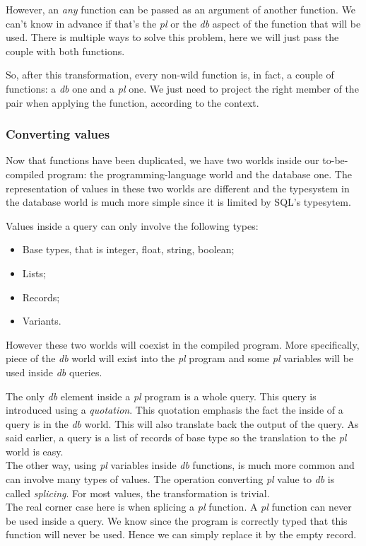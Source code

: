 \documentclass[11pt]{article}
\newcommand\mysc[1]{{\rmfamily\textsc{#1}}\xspace}
\newcommand\sql{\mysc{SQL}}
\newcommand\effect[1]{{\em #1}}
\begin{document}
However, an \effect{any} function can be passed as an argument of another function. We can't know in advance if that's the \effect{pl} or the \effect{db} aspect of the function that will be used. There is multiple ways to solve this problem, here we will just pass the couple with both functions.

So, after this transformation, every non-wild function is, in fact, a couple of functions: a \effect{db} one and a \effect{pl} one. We just need to project the right member of the pair when applying the function, according to the context.

\subsubsection{Converting values}

Now that functions have been duplicated, we have two worlds inside our to-be-compiled program: the programming-language world and the database one. The representation of values in these two worlds are different and the typesystem in the database world is much more simple since it is limited by \sql's typesytem. 

Values inside a query can only involve the following types:
\begin{itemize}
\item Base types, that is integer, float, string, boolean;
\item Lists;
\item Records;
\item Variants.
\end{itemize}

However these two worlds will coexist in the compiled program. More specifically, piece of the \effect{db} world will exist into the \effect{pl} program and some \effect{pl} variables will be used inside \effect{db} queries. 

The only \effect{db} element inside a \effect{pl} program is a whole query. This query is introduced using a \emph{quotation}. This quotation emphasis the fact the inside of a query is in the \effect{db} world. This will also translate back the output of the query. As said earlier, a query is a list of records of base type so the translation to the \effect{pl} world is easy.\\

The other way, using \effect{pl} variables inside \effect{db} functions, is much more common and can involve many types of values. 
The operation converting \effect{pl} value to \effect{db} is called \emph{splicing}. For most values, the transformation is trivial.\\
 The real corner case here is when splicing a \effect{pl} function. A \effect{pl} function can never be used inside a query. We know since the program is correctly typed that this function will never be used. Hence we can simply replace it by the empty record.
\end{document}
